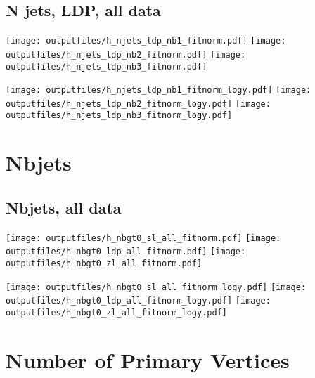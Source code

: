 \documentclass[11pt]{article}
\begin{document}
   \clearpage

    \subsection{ N jets, LDP, all data}

    \noindent
     \texttt{[image: outputfiles/h\_njets\_ldp\_nb1\_fitnorm.pdf]}
     \texttt{[image: outputfiles/h\_njets\_ldp\_nb2\_fitnorm.pdf]}
     \texttt{[image: outputfiles/h\_njets\_ldp\_nb3\_fitnorm.pdf]}

    \noindent
     \texttt{[image: outputfiles/h\_njets\_ldp\_nb1\_fitnorm\_logy.pdf]}
     \texttt{[image: outputfiles/h\_njets\_ldp\_nb2\_fitnorm\_logy.pdf]}
     \texttt{[image: outputfiles/h\_njets\_ldp\_nb3\_fitnorm\_logy.pdf]}

   \clearpage




    \clearpage
    \section{Nbjets}

    \subsection{ Nbjets, all data}

    \noindent
     \texttt{[image: outputfiles/h\_nbgt0\_sl\_all\_fitnorm.pdf]}
     \texttt{[image: outputfiles/h\_nbgt0\_ldp\_all\_fitnorm.pdf]}
     \texttt{[image: outputfiles/h\_nbgt0\_zl\_all\_fitnorm.pdf]}

    \noindent
     \texttt{[image: outputfiles/h\_nbgt0\_sl\_all\_fitnorm\_logy.pdf]}
     \texttt{[image: outputfiles/h\_nbgt0\_ldp\_all\_fitnorm\_logy.pdf]}
     \texttt{[image: outputfiles/h\_nbgt0\_zl\_all\_fitnorm\_logy.pdf]}







    \section{Number of Primary Vertices }
\end{document}
